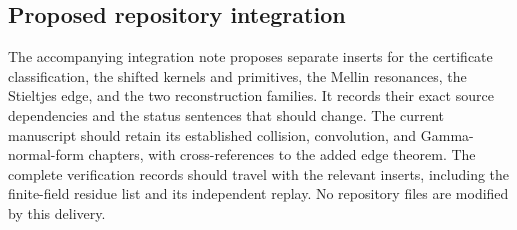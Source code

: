\subsection{Proposed repository integration}

The accompanying integration note proposes separate inserts for the
certificate classification, the shifted kernels and primitives, the
Mellin resonances, the Stieltjes edge, and the two reconstruction
families. It records their exact source dependencies and the status
sentences that should change. The current manuscript should retain
its established collision, convolution, and Gamma-normal-form
chapters, with cross-references to the added edge theorem. The
complete verification records should travel with the relevant
inserts, including the finite-field residue list and its independent
replay. No repository files are modified by this delivery.
